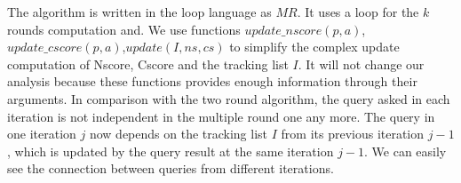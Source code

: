The algorithm is written in the loop language as $MR$. It uses a loop for the $k$ rounds computation and. We use functions $update\_nscore(p,a)$,$update\_cscore(p,a)$,$update(I,ns,cs)$ to simplify the complex update computation of Nscore, Cscore and the tracking list $I$. It will not change our analysis because these functions provides enough information through their arguments.
In comparison with the two round algorithm, the query asked in each iteration is not independent  in the multiple round one any more. The query in one iteration $j$ now depends on the tracking list $I$ from its previous iteration $j-1$, which is updated by the query result at the same iteration $j-1$. We can easily see the connection between queries from different iterations.

%

